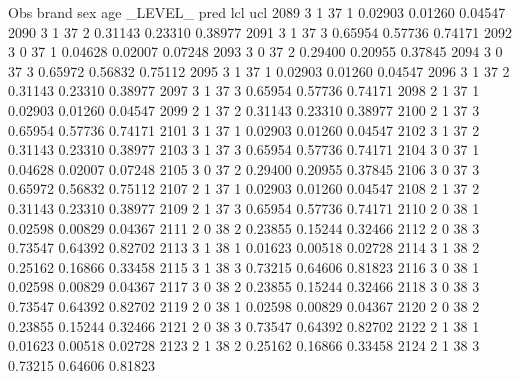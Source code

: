 \documentclass{article}
\begin{document}
\begin{Woutput}
 Obs    brand    sex    age    _LEVEL_      pred       lcl        ucl
2089      3       1      37       1       0.02903    0.01260    0.04547
2090      3       1      37       2       0.31143    0.23310    0.38977
2091      3       1      37       3       0.65954    0.57736    0.74171
2092      3       0      37       1       0.04628    0.02007    0.07248
2093      3       0      37       2       0.29400    0.20955    0.37845
2094      3       0      37       3       0.65972    0.56832    0.75112
2095      3       1      37       1       0.02903    0.01260    0.04547
2096      3       1      37       2       0.31143    0.23310    0.38977
2097      3       1      37       3       0.65954    0.57736    0.74171
2098      2       1      37       1       0.02903    0.01260    0.04547
2099      2       1      37       2       0.31143    0.23310    0.38977
2100      2       1      37       3       0.65954    0.57736    0.74171
2101      3       1      37       1       0.02903    0.01260    0.04547
2102      3       1      37       2       0.31143    0.23310    0.38977
2103      3       1      37       3       0.65954    0.57736    0.74171
2104      3       0      37       1       0.04628    0.02007    0.07248
2105      3       0      37       2       0.29400    0.20955    0.37845
2106      3       0      37       3       0.65972    0.56832    0.75112
2107      2       1      37       1       0.02903    0.01260    0.04547
2108      2       1      37       2       0.31143    0.23310    0.38977
2109      2       1      37       3       0.65954    0.57736    0.74171
2110      2       0      38       1       0.02598    0.00829    0.04367
2111      2       0      38       2       0.23855    0.15244    0.32466
2112      2       0      38       3       0.73547    0.64392    0.82702
2113      3       1      38       1       0.01623    0.00518    0.02728
2114      3       1      38       2       0.25162    0.16866    0.33458
2115      3       1      38       3       0.73215    0.64606    0.81823
2116      3       0      38       1       0.02598    0.00829    0.04367
2117      3       0      38       2       0.23855    0.15244    0.32466
2118      3       0      38       3       0.73547    0.64392    0.82702
2119      2       0      38       1       0.02598    0.00829    0.04367
2120      2       0      38       2       0.23855    0.15244    0.32466
2121      2       0      38       3       0.73547    0.64392    0.82702
2122      2       1      38       1       0.01623    0.00518    0.02728
2123      2       1      38       2       0.25162    0.16866    0.33458
2124      2       1      38       3       0.73215    0.64606    0.81823

\end{Woutput}
\end{document}
